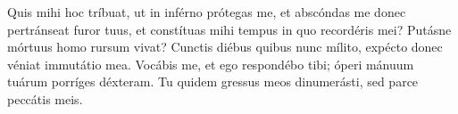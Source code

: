 Quis mihi hoc tríbuat, ut in inférno prótegas me,
	et abscóndas me donec pertránseat furor tuus,
	et constítuas mihi tempus in quo recordéris mei?
Putásne mórtuus homo rursum vivat?
Cunctis diébus quibus nunc mílito, expécto donec véniat immutátio mea.
Vocábis me, et ego respondébo tibi;
	óperi mánuum tuárum porríges déxteram.
Tu quidem gressus meos dinumerásti,
	sed parce peccátis meis.
